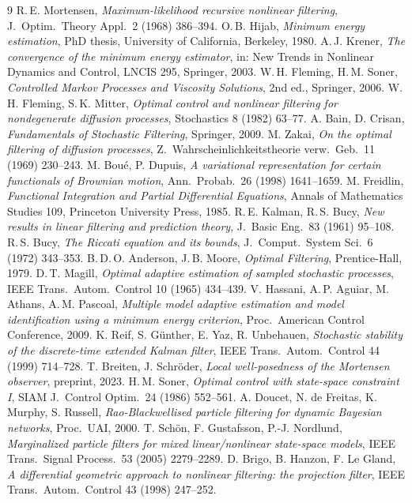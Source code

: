 \documentclass[11pt,a4paper]{article}
\theoremstyle{plain}
\theoremstyle{definition}
\theoremstyle{remark}
\begin{document}
\begin{thebibliography}{9}\small
{} R.\,E. Mortensen, \emph{Maximum-likelihood recursive nonlinear filtering}, J.\ Optim.\ Theory Appl.\ 2 (1968) 386--394.
 O.\,B. Hijab, \emph{Minimum energy estimation}, PhD thesis, University of California, Berkeley, 1980.
 A.\,J. Krener, \emph{The convergence of the minimum energy estimator}, in: New Trends in Nonlinear Dynamics and Control, LNCIS 295, Springer, 2003.
 W.\,H. Fleming, H.\,M. Soner, \emph{Controlled Markov Processes and Viscosity Solutions}, 2nd ed., Springer, 2006.
 W.\,H. Fleming, S.\,K. Mitter, \emph{Optimal control and nonlinear filtering for nondegenerate diffusion processes}, Stochastics 8 (1982) 63--77.
 A. Bain, D. Crisan, \emph{Fundamentals of Stochastic Filtering}, Springer, 2009.
 M. Zakai, \emph{On the optimal filtering of diffusion processes}, Z.\ Wahrscheinlichkeitstheorie verw.\ Geb.\ 11 (1969) 230--243.
 M. Bou\'e, P. Dupuis, \emph{A variational representation for certain functionals of Brownian motion}, Ann.\ Probab.\ 26 (1998) 1641--1659.
 M. Freidlin, \emph{Functional Integration and Partial Differential Equations}, Annals of Mathematics Studies 109, Princeton University Press, 1985.
 R.\,E. Kalman, R.\,S. Bucy, \emph{New results in linear filtering and prediction theory}, J.\ Basic Eng.\ 83 (1961) 95--108.
 R.\,S. Bucy, \emph{The Riccati equation and its bounds}, J.\ Comput.\ System Sci.\ 6 (1972) 343--353.
 B.\,D.\,O. Anderson, J.\,B. Moore, \emph{Optimal Filtering}, Prentice-Hall, 1979.
 D.\,T. Magill, \emph{Optimal adaptive estimation of sampled stochastic processes}, IEEE Trans.\ Autom.\ Control 10 (1965) 434--439.
 V. Hassani, A.\,P. Aguiar, M. Athans, A.\,M. Pascoal, \emph{Multiple model adaptive estimation and model identification using a minimum energy criterion}, Proc.\ American Control Conference, 2009.
 K. Reif, S. G\"unther, E. Yaz, R. Unbehauen, \emph{Stochastic stability of the discrete-time extended Kalman filter}, IEEE Trans.\ Autom.\ Control 44 (1999) 714--728.
 T. Breiten, J. Schr\"oder, \emph{Local well-posedness of the Mortensen observer}, preprint, 2023.
 H.\,M. Soner, \emph{Optimal control with state-space constraint I}, SIAM J.\ Control Optim.\ 24 (1986) 552--561.
 A. Doucet, N. de Freitas, K. Murphy, S. Russell, \emph{Rao-Blackwellised particle filtering for dynamic Bayesian networks}, Proc.\ UAI, 2000.
 T. Sch\"on, F. Gustafsson, P.-J. Nordlund, \emph{Marginalized particle filters for mixed linear/nonlinear state-space models}, IEEE Trans.\ Signal Process.\ 53 (2005) 2279--2289.
 D. Brigo, B. Hanzon, F. Le Gland, \emph{A differential geometric approach to nonlinear filtering: the projection filter}, IEEE Trans.\ Autom.\ Control 43 (1998) 247--252.
\end{thebibliography}
\end{document}
